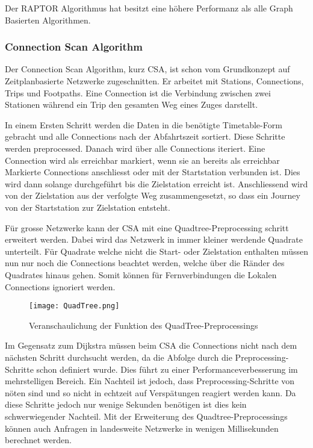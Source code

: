 Der RAPTOR Algorithmus hat besitzt eine höhere Performanz als alle Graph Basierten Algorithmen. ~\cite{raptor}

\subsubsection{Connection Scan Algorithm}
\label{sec:Connection Scan Algorithm}
Der Connection Scan Algorithm, kurz CSA, ist schon vom Grundkonzept auf Zeitplanbasierte Netzwerke zugeschnitten. Er arbeitet mit Stations, Connections, Trips und Footpaths. Eine Connection ist die Verbindung zwischen zwei Stationen während ein Trip den gesamten Weg eines Zuges darstellt. 

In einem Ersten Schritt werden die Daten in die benötigte Timetable-Form gebracht und alle Connections nach der Abfahrtszeit sortiert. Diese Schritte werden preprocessed. Danach wird über alle Connections iteriert. Eine Connection wird als erreichbar markiert, wenn sie an bereits als erreichbar Markierte Connections anschliesst oder mit der Startstation verbunden ist. Dies wird dann solange durchgeführt bis die Zielstation erreicht ist. Anschliessend wird von der Zielstation aus der verfolgte Weg zusammengesetzt, so dass ein Journey von der Startstation zur Zielstation entsteht. 

Für grosse Netzwerke kann der CSA mit eine Quadtree-Preprocessing schritt erweitert werden. Dabei wird das Netzwerk in immer kleiner werdende Quadrate unterteilt. Für Quadrate welche nicht die Start- oder Zielstation enthalten müssen nun nur noch die Connections beachtet werden, welche über die Ränder des Quadrates hinaus gehen. Somit können für Fernverbindungen die Lokalen Connections ignoriert werden.
\begin{figure}[]
	\centering
	\texttt{[image: QuadTree.png]}
	\caption{Veranschaulichung der Funktion des QuadTree-Preprocessings ~\cite{csa}}
	\label{fig:QuadTree}
\end{figure}


Im Gegensatz zum Dijkstra müssen beim CSA die Connections nicht nach dem nächsten Schritt durchsucht werden, da die Abfolge durch die Preprocessing-Schritte schon definiert wurde. Dies führt zu einer Performanceverbesserung im mehrstelligen Bereich. Ein Nachteil ist jedoch, dass Preprocessing-Schritte von nöten sind und so nicht in echtzeit auf Verspätungen reagiert werden kann. Da diese Schritte jedoch nur wenige Sekunden benötigen ist dies kein schwerwiegender Nachteil. Mit der Erweiterung des Quadtree-Preprocessings können auch Anfragen in landesweite Netzwerke in wenigen Millisekunden berechnet werden. 

